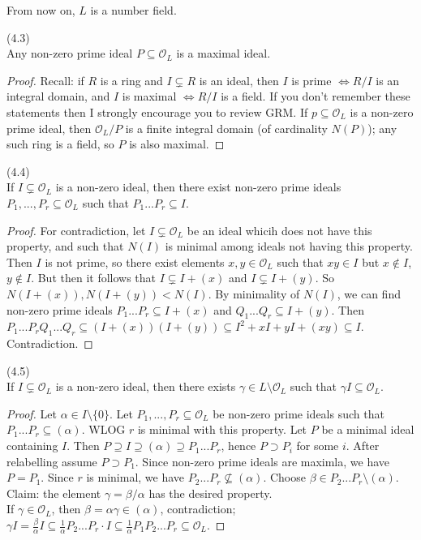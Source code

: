 \documentclass[a4paper]{article}
\begin{document}
From now on, $L$ is a number field.

\begin{lemma} (4.3)\\
Any non-zero prime ideal $P \subseteq \mathcal{O}_L$ is a maximal ideal.
\begin{proof}
Recall: if $R$ is a ring and $I \subsetneq R$ is an ideal, then $I$ is prime $\iff R/I$ is an integral domain, and $I$ is maximal $\iff R/I$ is a field. If you don't remember these statements then I strongly encourage you to review GRM. If $p \subseteq \mathcal{O}_L$ is a non-zero prime ideal, then $\mathcal{O}_L/P$ is a finite integral domain (of cardinality $N(P)$); any such ring is a field, so $P$ is also maximal.
\end{proof}
\end{lemma}

\begin{lemma} (4.4)\\
If $I \subsetneq \mathcal{O}_L$ is a non-zero ideal, then there exist non-zero prime ideals $P_1,...,P_r \subseteq \mathcal{O}_L$ such that $P_1...P_r \subseteq I$.
\begin{proof}
For contradiction, let $I \subsetneq \mathcal{O}_L$ be an ideal whicih does not have this property, and such that $N(I)$ is minimal among ideals not having this property. Then $I$ is not prime, so there exist elements $x,y \in \mathcal{O}_L$ such that $xy \in I$ but $x \not\in I$, $y \not\in I$. But then it follows that $I \subsetneq I+(x)$ and $I \subsetneq I+(y)$. So $N(I+(x)), N(I+(y)) < N(I)$. By minimality of $N(I)$, we can find non-zero prime ideals $P_1...P_r \subseteq I+(x)$ and $Q_1...Q_r \subseteq I+(y)$. Then $P_1 ... P_rQ_1...Q_r \subseteq (I+(x))(I+(y)) \subseteq I^2 +xI+yI+(xy) \subseteq I$. Contradiction.
\end{proof}
\end{lemma}

\begin{lemma} (4.5)\\
If $I \subsetneq \mathcal{O}_L$ is a non-zero ideal, then there exists $\gamma \in L\setminus \mathcal{O}_L$ such that $\gamma I \subseteq \mathcal{O}_L$.
\begin{proof}
Let $\alpha \in I \setminus \{0\}$. Let $P_1,...,P_r \subseteq \mathcal{O}_L$ be non-zero prime ideals such that $P_1...P_r \subseteq (\alpha)$. WLOG $r$ is minimal with this property. Let $P$ be a minimal ideal containing $I$. Then $P \supseteq I \supseteq (\alpha) \supseteq P_1...P_r$, hence $P \supset P_i$ for some $i$. After relabelling assume $P \supset P_1$. Since non-zero prime ideals are maximla, we have $P=P_1$. Since $r$ is minimal, we have $P_2...P_r \not\subseteq(\alpha)$. Choose $\beta \in P_2...P_r \setminus (\alpha)$.\\
Claim: the element $\gamma = \beta/\alpha$ has the desired property.\\
If $\gamma \in \mathcal{O}_L$, then $\beta = \alpha\gamma \in (\alpha)$, contradiction;\\
$\gamma I = \frac{\beta}{\alpha} I \subseteq \frac{1}{\alpha} P_2...P_r \cdot I \subseteq \frac{1}{\alpha} P_1P_2...P_r \subseteq \mathcal{O}_L$.
\end{proof}
\end{lemma}


\iffalse
\begin{equation*}
\begin{aligned}

\end{aligned}
\end{equation*}
\fi
\end{document}
